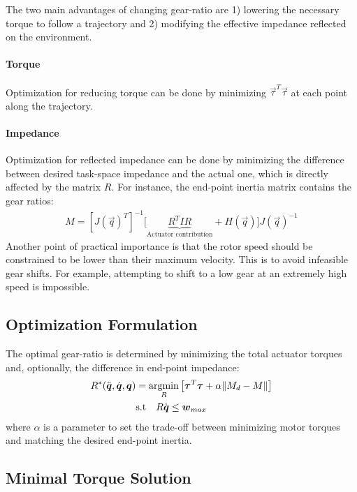 The two main advantages of changing gear-ratio are 1) lowering the necessary torque to follow a trajectory and 2) modifying the effective impedance reflected on the environment. 

\paragraph{Torque}
Optimization for reducing torque can be done by minimizing $\vec{\tau}^T \vec{\tau}$ at each point along the trajectory. 

\paragraph{Impedance}
Optimization for reflected impedance can be done by minimizing the difference between desired task-space impedance and the actual one, which is directly affected by the matrix $R$. For instance, the end-point inertia matrix contains the gear ratios: 
%
\begin{align}
	M = [J(\vec{q})^T]^{-1} \big [ \underbrace{ R^T I R }_{\text{Actuator contribution}} + H( \vec{q} ) \big ] J(\vec{q})^{-1}
 \label{eq:endpointmass}
\end{align}
%
Another point of practical importance is that the rotor speed should be constrained to be lower than their maximum velocity. This is to avoid infeasible gear shifts. For example, attempting to shift to a low gear at an extremely high speed is impossible. 

\subsection{Optimization Formulation}
 The optimal gear-ratio is determined by minimizing the total actuator torques and, optionally, the difference in end-point impedance:
%
\begin{align}
	R^{*}(\ddot{\vec{q}},\dot{\vec{q}},\vec{q}) &= \operatornamewithlimits{argmin}\limits_{R} \left[ \vec{\tau}^T \vec{\tau} + \alpha \| M_{d} - M \| \right]  \\
	& \text{s.t}  \quad R \dot{\vec{q}} \leq \vec{w}_{max} 
\label{eq:rmin_general}
\end{align}
%
where $\alpha$ is a parameter to set the trade-off between minimizing motor torques and matching the desired end-point inertia.
%

\subsection{Minimal Torque Solution}

